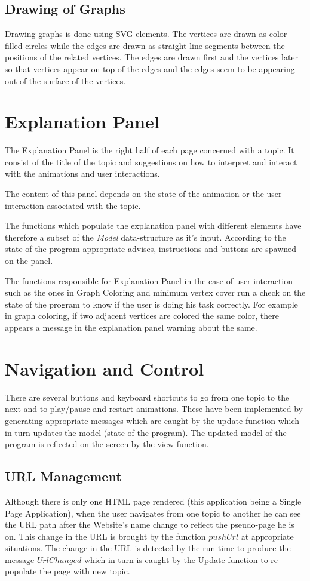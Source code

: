 \subsection{Drawing of Graphs}
Drawing graphs is done using SVG elements. The vertices are drawn as color
filled circles while the edges are drawn as straight line segments between the
positions of the related vertices. The edges are drawn first and the vertices
later so that vertices appear on top of the edges and the edges seem to be
appearing out of the surface of the vertices.

\section{Explanation Panel}

The Explanation Panel is the right half of each page concerned with a topic. 
It consist of the title of the topic and suggestions on how
to interpret and interact with the animations and user interactions.

The content of this panel depends on the state of the animation or the user
interaction associated with the topic.

The functions which populate the explanation panel with different elements have
therefore a subset of the \emph{Model} data-structure as it's input.  According
to the state of the program appropriate advises, instructions and buttons are
spawned on the panel.

The functions responsible for Explanation Panel in the case of user interaction
such as the ones in Graph Coloring and minimum vertex cover run a check on the
state of the program to know if the user is doing his task correctly. For
example in graph coloring, if two adjacent vertices are colored the same color,
there appears a message in the explanation panel warning about the same.

\section{Navigation and Control}
There are several buttons and keyboard shortcuts to go from one topic to the
next and to play/pause and restart animations. These have been implemented by
generating appropriate messages which are caught by the update function which
in turn updates the model (state of the program). The updated model of the
program is reflected on the screen by the view function.

\subsection{URL Management}
Although there is only one HTML page rendered (this application being a Single
Page Application), when the user navigates from one topic to another he can see
the URL path after the Website's name change to reflect the pseudo-page he is
on. This change in the URL is brought by the function $pushUrl$ at
appropriate situations.  The change in the URL is detected by the run-time to
produce the message $UrlChanged$ which in turn is caught by the Update function
to re-populate the page with new topic.

